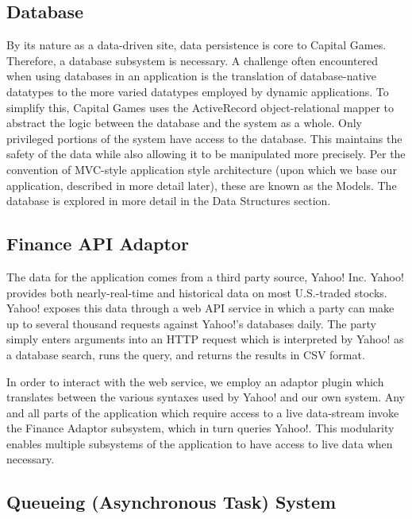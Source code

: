 
\subsection{Database}
By its nature as a data-driven site, data persistence
is core to Capital Games. Therefore, a database subsystem is necessary. 
A challenge often encountered when using databases in an application is
the translation of database-native datatypes to the more varied datatypes
employed by dynamic applications. \cite{wiki:orm} To simplify this,
Capital Games uses the ActiveRecord object-relational mapper to abstract
the logic between the database and the system as a whole. Only privileged portions
of the system have access to the database. This maintains the safety of the
data while also allowing it to be manipulated more precisely. Per the convention
of MVC-style application style architecture 
(upon which we base our application, described in more detail later), these 
are known as the Models. The database is explored in more detail in the Data Structures section.

\subsection{Finance API Adaptor}
The data for the application comes from a third party source, Yahoo! Inc. Yahoo!
provides both nearly-real-time and historical data on most U.S.-traded stocks.
Yahoo! exposes this data through a web API service in which a party can make
up to several thousand requests against Yahoo!'s databases daily. The party
simply enters arguments into an HTTP request which is interpreted by Yahoo!
as a database search, runs the query, and returns the results in CSV format. \cite{gummy}

In order to interact with the web service, we employ an adaptor plugin which
translates between the various syntaxes used by Yahoo! and our own system.
Any and all parts of the application which require access to a live data-stream
invoke the Finance Adaptor subsystem, which in turn queries Yahoo!. This
modularity enables multiple subsystems of the application to have access to live data
when necessary.

\subsection{Queueing (Asynchronous Task) System}

